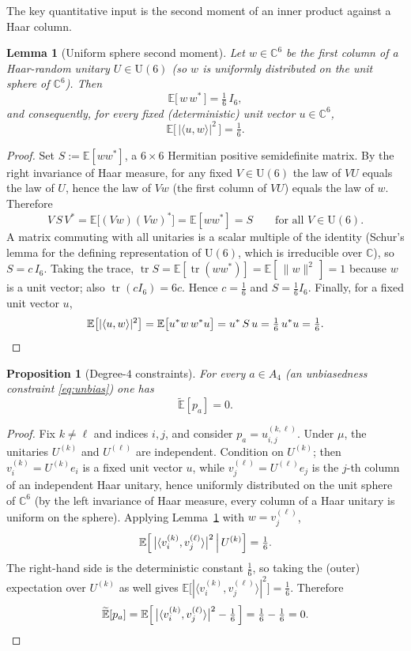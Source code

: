 \documentclass{amsart}
\newtheorem{lemma}{Lemma}
\newtheorem{proposition}{Proposition}
\theoremstyle{definition}
\begin{document}
The key quantitative input is the second moment of an inner product against a Haar column.

\begin{lemma}[Uniform sphere second moment]\label{lem:sphere}
Let $w\in\mathbb{C}^6$ be the first column of a Haar-random unitary $U\in\mathrm{U}(6)$ (so $w$
is uniformly distributed on the unit sphere of $\mathbb{C}^6$). Then
\[
\mathbb{E}\bigl[\,w\,w^{*}\,\bigr]=\tfrac16\,I_6 ,
\]
and consequently, for every fixed (deterministic) unit vector $u\in\mathbb{C}^6$,
\[
\mathbb{E}\bigl[\,|\langle u,w\rangle|^2\,\bigr]=\tfrac16 .
\]
\end{lemma}

\begin{proof}
Set $S:=\mathbb{E}[ww^{*}]$, a $6\times6$ Hermitian positive semidefinite matrix. By the right
invariance of Haar measure, for any fixed $V\in\mathrm{U}(6)$ the law of $VU$ equals the law of
$U$, hence the law of $Vw$ (the first column of $VU$) equals the law of $w$. Therefore
\[
V\,S\,V^{*}=\mathbb{E}\bigl[(Vw)(Vw)^{*}\bigr]=\mathbb{E}[ww^{*}]=S
\qquad\text{for all }V\in\mathrm{U}(6).
\]
A matrix commuting with all unitaries is a scalar multiple of the identity (Schur's lemma for
the defining representation of $\mathrm{U}(6)$, which is irreducible over $\mathbb{C}$), so
$S=c\,I_6$. Taking the trace, $\operatorname{tr}S=\mathbb{E}[\operatorname{tr}(ww^{*})]
=\mathbb{E}[\,\|w\|^2\,]=1$ because $w$ is a unit vector; also $\operatorname{tr}(cI_6)=6c$.
Hence $c=\tfrac16$ and $S=\tfrac16 I_6$. Finally, for a fixed unit vector $u$,
\[
\mathbb{E}\bigl[|\langle u,w\rangle|^2\bigr]
=\mathbb{E}\bigl[u^{*}w\,w^{*}u\bigr]
=u^{*}\,S\,u=\tfrac16\,u^{*}u=\tfrac16. \qedhere
\]
\end{proof}

\begin{proposition}[Degree-$4$ constraints]\label{prop:deg4}
For every $a\in A_4$ (an unbiasedness constraint \eqref{eq:unbias}) one has
\[
\widetilde{\mathbb{E}}[p_a]=0 .
\]
\end{proposition}

\begin{proof}
Fix $k\ne\ell$ and indices $i,j$, and consider $p_a=u^{(k,\ell)}_{i,j}$. Under $\mu$, the
unitaries $U^{(k)}$ and $U^{(\ell)}$ are independent. Condition on $U^{(k)}$; then
$v^{(k)}_i=U^{(k)}e_i$ is a fixed unit vector $u$, while $v^{(\ell)}_j=U^{(\ell)}e_j$ is the
$j$-th column of an independent Haar unitary, hence uniformly distributed on the unit sphere of
$\mathbb{C}^6$ (by the left invariance of Haar measure, every column of a Haar unitary is
uniform on the sphere). Applying Lemma~\ref{lem:sphere} with $w=v^{(\ell)}_j$,
\[
\mathbb{E}\Bigl[\,\bigl|\langle v^{(k)}_i,v^{(\ell)}_j\rangle\bigr|^2 \,\Big|\, U^{(k)}\Bigr]
=\tfrac16 .
\]
The right-hand side is the deterministic constant $\tfrac16$, so taking the (outer)
expectation over $U^{(k)}$ as well gives
$\mathbb{E}\bigl[|\langle v^{(k)}_i,v^{(\ell)}_j\rangle|^2\bigr]=\tfrac16$. Therefore
\[
\widetilde{\mathbb{E}}[p_a]
=\mathbb{E}\Bigl[\,\bigl|\langle v^{(k)}_i,v^{(\ell)}_j\rangle\bigr|^2-\tfrac16\,\Bigr]
=\tfrac16-\tfrac16=0 . \qedhere
\]
\end{proof}
\end{document}
